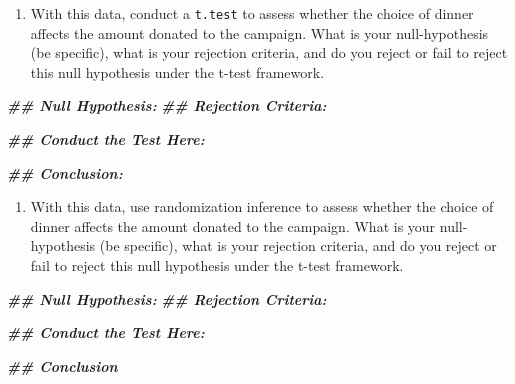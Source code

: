 \documentclass[
]{article}
\newenvironment{Shaded}{\begin{snugshade}}{\end{snugshade}}
\newcommand{\DocumentationTok}[1]{\textcolor[rgb]{0.56,0.35,0.01}{\textbf{\textit{#1}}}}
\providecommand{\tightlist}{%
  \setlength{\itemsep}{0pt}\setlength{\parskip}{0pt}}
\begin{document}
\begin{enumerate}
\def\labelenumi{\arabic{enumi}.}
\tightlist
\item
  With this data, conduct a \texttt{t.test} to assess whether the choice of dinner affects the amount donated to the campaign. What is your null-hypothesis (be specific), what is your rejection criteria, and do you reject or fail to reject this null hypothesis under the t-test framework.
\end{enumerate}

\begin{Shaded}
\begin{Highlighting}[]
\DocumentationTok{\#\# Null Hypothesis: }
\DocumentationTok{\#\# Rejection Criteria: }

\DocumentationTok{\#\# Conduct the Test Here: }

\DocumentationTok{\#\# Conclusion: }
\end{Highlighting}
\end{Shaded}

\begin{enumerate}
\def\labelenumi{\arabic{enumi}.}
\setcounter{enumi}{1}
\tightlist
\item
  With this data, use randomization inference to assess whether the choice of dinner affects the amount donated to the campaign. What is your null-hypothesis (be specific), what is your rejection criteria, and do you reject or fail to reject this null hypothesis under the t-test framework.
\end{enumerate}

\begin{Shaded}
\begin{Highlighting}[]
\DocumentationTok{\#\# Null Hypothesis: }
\DocumentationTok{\#\# Rejection Criteria: }

\DocumentationTok{\#\# Conduct the Test Here:}

\DocumentationTok{\#\# Conclusion}
\end{Highlighting}
\end{Shaded}
\end{document}
